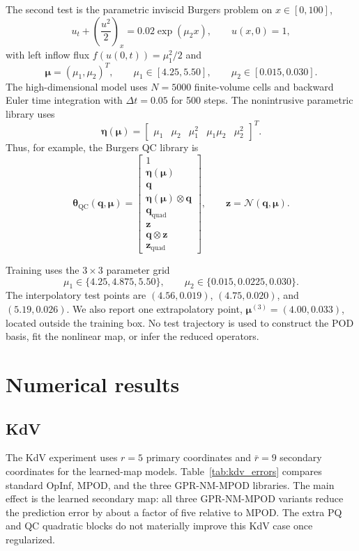 \documentclass[11pt]{article}
\newcommand{\bq}{\boldsymbol q}
\newcommand{\bz}{\boldsymbol z}
\newcommand{\bmu}{\boldsymbol\mu}
\newcommand{\boldeta}{\boldsymbol\eta}
\newcommand{\btheta}{\boldsymbol\theta}
\newcommand{\Nmap}{\mathcal{N}}
\newcommand{\qdim}{r}
\newcommand{\rbar}{\bar r}
\begin{document}
The second test is the parametric inviscid Burgers problem on $x\in[0,100]$,
\begin{equation}
  u_t+\left(\frac{u^2}{2}\right)_x=0.02\exp(\mu_2 x),
  \qquad
  u(x,0)=1,
  \label{eq:burgers}
\end{equation}
with left inflow flux $f(u(0,t))=\mu_1^2/2$ and
\[
  \bmu=(\mu_1,\mu_2)^T,\qquad
  \mu_1\in[4.25,5.50],\qquad
  \mu_2\in[0.015,0.030].
\]
The high-dimensional model uses $N=5000$ finite-volume cells and backward Euler
time integration with $\Delta t=0.05$ for 500 steps.  The nonintrusive
parametric library uses
\begin{equation}
  \boldeta(\bmu)=
  \begin{bmatrix}
  \mu_1 & \mu_2 & \mu_1^2 & \mu_1\mu_2 & \mu_2^2
  \end{bmatrix}^T.
  \label{eq:param_features}
\end{equation}
Thus, for example, the Burgers QC library is
\[
  \btheta_{\mathrm{QC}}(\bq,\bmu)=
  \begin{bmatrix}
  1\\
  \boldeta(\bmu)\\
  \bq\\
  \boldeta(\bmu)\otimes\bq\\
  \bq_{\mathrm{quad}}\\
  \bz\\
  \bq\otimes\bz\\
  \bz_{\mathrm{quad}}
  \end{bmatrix},
  \qquad
  \bz=\Nmap(\bq,\bmu).
\]

Training uses the $3\times3$ parameter grid
\[
  \mu_1\in\{4.25,4.875,5.50\},\qquad
  \mu_2\in\{0.015,0.0225,0.030\}.
\]
The interpolatory test points are
$(4.56,0.019)$, $(4.75,0.020)$, and $(5.19,0.026)$.  We also report one
extrapolatory point, $\bmu^{(3)}=(4.00,0.033)$, located outside the training
box.  No test trajectory is used to construct the POD basis, fit the nonlinear
map, or infer the reduced operators.

\section{Numerical results}
\label{sec:results}

\subsection{KdV}

The KdV experiment uses $\qdim=5$ primary coordinates and $\rbar=9$ secondary
coordinates for the learned-map models.  Table~\ref{tab:kdv_errors} compares
standard OpInf, MPOD, and the three GPR-NM-MPOD libraries.  The main effect is
the learned secondary map: all three GPR-NM-MPOD variants reduce the prediction
error by about a factor of five relative to MPOD.  The extra PQ and QC
quadratic blocks do not materially improve this KdV case once regularized.
\end{document}
